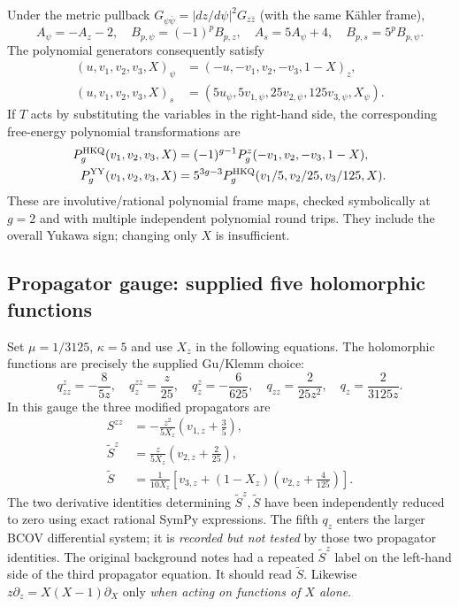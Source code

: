 Under the metric pullback $G_{\psi\bar\psi}=|dz/d\psi|^2G_{z\bar z}$
(with the same K\"ahler frame),
\begin{equation}
 A_\psi=-A_z-2,\quad B_{p,\psi}=(-1)^p B_{p,z},
 \quad A_s=5A_\psi+4,\quad B_{p,s}=5^p B_{p,\psi}.
\end{equation}
The polynomial generators consequently satisfy
\begin{align}\label{eq:2026gens}
(u,v_1,v_2,v_3,X)_\psi
 &=(-u,-v_1,v_2,-v_3,1-X)_z,\\
(u,v_1,v_2,v_3,X)_s
 &=(5u_\psi,5v_{1,\psi},25v_{2,\psi},125v_{3,\psi},X_\psi).
\end{align}
If $T$ acts by substituting the variables in the right-hand side, the corresponding
free-energy polynomial transformations are
\begin{align}\label{eq:2026polys}
P_g^{\rm HKQ}(v_1,v_2,v_3,X)
 &=(-1)^{g-1}P_g^{z}(-v_1,v_2,-v_3,1-X),\\
P_g^{\rm YY}(v_1,v_2,v_3,X)
 &=5^{3g-3}P_g^{\rm HKQ}(v_1/5,v_2/25,v_3/125,X).
\end{align}
These are involutive/rational polynomial frame maps, checked symbolically at
$g=2$ and with multiple independent polynomial round trips. They include
the overall Yukawa sign; changing only $X$ is insufficient.

\subsection{Propagator gauge: supplied five holomorphic functions}
Set $\mu=1/3125$, $\kappa=5$ and use $X_z$ in the following equations.
The holomorphic functions are precisely the supplied Gu/Klemm choice:
\begin{equation}\label{eq:2026gauge}
 q^z_{zz}=-\frac8{5z},\quad q_z^{zz}=\frac z{25},\quad
 q_z^z=-\frac6{625},\quad q_{zz}=\frac2{25z^2},\quad
 q_z=\frac2{3125z}.
\end{equation}
In this gauge the three modified propagators are
\begin{align}\label{eq:2026prop}
 S^{zz}&=-\frac{z^2}{5X_z}\left(v_{1,z}+\frac35\right),\\
 \widetilde S^{z}&=\frac{z}{5X_z}\left(v_{2,z}+\frac2{25}\right),\\
 \widetilde S&=\frac{1}{10X_z}
 \left[v_{3,z}+(1-X_z)\left(v_{2,z}+\frac4{125}\right)\right].
\end{align}
The two derivative identities determining $\widetilde S^z,\widetilde S$ have
been independently reduced to zero using exact rational SymPy expressions.
The fifth $q_z$ enters the larger BCOV differential system; it is
\emph{recorded but not tested} by those two propagator identities.
The original background notes had a repeated $\widetilde S^z$ label on the
left-hand side of the third propagator equation. It should read
$\widetilde S$. Likewise $z\partial_z=X(X-1)\partial_X$ only
\emph{when acting on functions of $X$ alone}.

